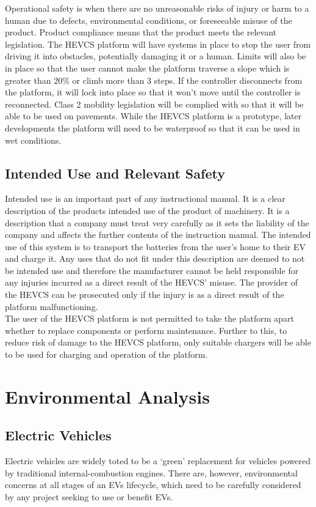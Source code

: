 \documentclass [12pt]{article}
\begin{document}
Operational safety is when there are no unreasonable risks of injury or harm to a human due to defects, environmental conditions, or foreseeable misuse of the product. Product compliance means that the product meets the relevant legislation.
The HEVCS platform will have systems in place to stop the user from driving it into obstacles, potentially damaging it or a human. Limits will also be in place so that the user cannot make the platform traverse a slope which is greater than 20\% or climb more than 3 steps. If the controller disconnects from the platform, it will lock into place so that it won’t move until the controller is reconnected. Class 2 mobility legislation will be complied with so that it will be able to be used on pavements. While the HEVCS platform is a prototype, later developments the platform will need to be waterproof so that it can be used in wet conditions. \cite{IP_Rating}

\subsection{Intended Use and Relevant Safety}\label{sec:Intended_Use_and_Relevant_Safety}

Intended use is an important part of any instructional manual. It is a clear description of the products intended use of the product of machinery. It is a description that a company must treat very carefully as it sets the liability of the company and affects the further contents of the instruction manual. \cite{Intended_Use}
The intended use of this system is to transport the batteries from the user’s home to their EV and charge it. Any uses that do not fit under this description are deemed to not be intended use and therefore the manufacturer cannot be held responsible for any injuries incurred as a direct result of the HEVCS’ misuse. The provider of the HEVCS can be prosecuted only if the injury is as a direct result of the platform malfunctioning.
\\
The user of the HEVCS platform is not permitted to take the platform apart whether to replace components or perform maintenance. Further to this, to reduce risk of damage to the HEVCS platform, only suitable chargers will be able to be used for charging and operation of the platform.


\section{Environmental Analysis}
\subsection{Electric Vehicles}
Electric vehicles are widely toted to be a ‘green’ replacement for vehicles powered by traditional internal-combustion engines. There are, however, environmental concerns at all stages of an EVs lifecycle, which need to be carefully considered by any project seeking to use or benefit EVs.
\end{document}
